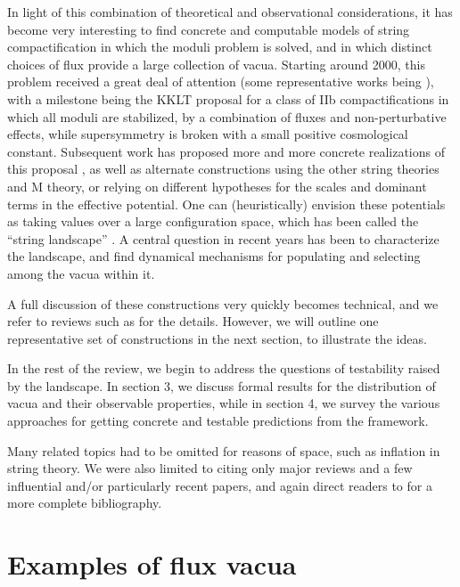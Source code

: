 \documentclass[aps,amsfonts]{ar2e}
\begin{document}
In light of
this combination of theoretical and observational considerations,
it has become very interesting to find concrete and computable
models of string compactification in which the moduli problem is
solved, and in which distinct choices of flux provide a large collection
of vacua.  Starting around 2000, this problem received a great
deal of attention (some representative
works being \cite{Gukov:1999ya,Dasgupta:1999ss,Mayr:2000hh,Curio:2000sc,
Giddings:2001yu,Silverstein:2001xn}),
with
a milestone being the KKLT
proposal \cite{Kachru:2003aw} for a class of IIb compactifications in
which all moduli are stabilized, by a combination of fluxes and
non-perturbative effects, while supersymmetry is broken with a small
positive cosmological constant.  Subsequent work has proposed more
and more concrete realizations of this proposal \cite{Denef:2004dm,
Denef:2005mm,Lust:2006zg}, as well as
alternate constructions using the other string theories and M
theory, or relying on different hypotheses for the scales and
dominant terms in the effective potential.
One can (heuristically) envision these potentials as
taking values over a large configuration space,
which has been called the ``string landscape''
\cite{Susskind:2003kw}.
A central question in recent years has
been to characterize the landscape, and find dynamical mechanisms for
populating and selecting among the vacua within it.

A full discussion of these constructions very quickly becomes
technical, and we refer to reviews such as
\cite{Douglas:2006es,Blumenhagen:2006ci,Grana:2005jc,
Silverstein:2004id, Frey:2003tf}
for the details.  However, we will outline one
representative set of constructions in the next section, to illustrate the
ideas.

In the rest of the review, we begin to address the questions of
testability raised by the landscape.  In section 3, we discuss
formal results for the distribution of vacua and their observable
properties, while in section 4, we survey the various approaches for
getting concrete and testable predictions from the framework.

Many related topics had to be omitted for reasons of space, such as
inflation in string theory.  We were also limited to citing only major
reviews and a few influential and/or particularly recent papers, and
again direct readers to
\cite{Douglas:2006es,Blumenhagen:2006ci,
Grana:2005jc,Silverstein:2004id, Frey:2003tf}
for a more complete bibliography.

\section{Examples of flux vacua}
\label{sec:example}
\end{document}
